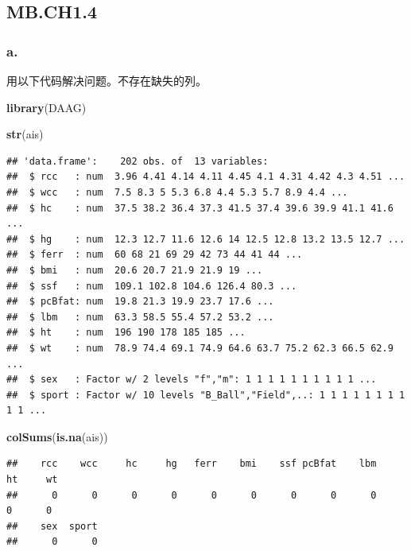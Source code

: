 \documentclass[
]{article}
\newenvironment{Shaded}{\begin{snugshade}}{\end{snugshade}}
\newcommand{\FunctionTok}[1]{\textcolor[rgb]{0.13,0.29,0.53}{\textbf{#1}}}
\newcommand{\NormalTok}[1]{#1}
\begin{document}
\subsection{MB.CH1.4}\label{mb.ch1.4}

\subsubsection{a.}\label{a.-3}

用以下代码解决问题。不存在缺失的列。

\begin{Shaded}
\begin{Highlighting}[]
\FunctionTok{library}\NormalTok{(DAAG)}

\FunctionTok{str}\NormalTok{(ais)}
\end{Highlighting}
\end{Shaded}

\begin{verbatim}
## 'data.frame':    202 obs. of  13 variables:
##  $ rcc   : num  3.96 4.41 4.14 4.11 4.45 4.1 4.31 4.42 4.3 4.51 ...
##  $ wcc   : num  7.5 8.3 5 5.3 6.8 4.4 5.3 5.7 8.9 4.4 ...
##  $ hc    : num  37.5 38.2 36.4 37.3 41.5 37.4 39.6 39.9 41.1 41.6 ...
##  $ hg    : num  12.3 12.7 11.6 12.6 14 12.5 12.8 13.2 13.5 12.7 ...
##  $ ferr  : num  60 68 21 69 29 42 73 44 41 44 ...
##  $ bmi   : num  20.6 20.7 21.9 21.9 19 ...
##  $ ssf   : num  109.1 102.8 104.6 126.4 80.3 ...
##  $ pcBfat: num  19.8 21.3 19.9 23.7 17.6 ...
##  $ lbm   : num  63.3 58.5 55.4 57.2 53.2 ...
##  $ ht    : num  196 190 178 185 185 ...
##  $ wt    : num  78.9 74.4 69.1 74.9 64.6 63.7 75.2 62.3 66.5 62.9 ...
##  $ sex   : Factor w/ 2 levels "f","m": 1 1 1 1 1 1 1 1 1 1 ...
##  $ sport : Factor w/ 10 levels "B_Ball","Field",..: 1 1 1 1 1 1 1 1 1 1 ...
\end{verbatim}

\begin{Shaded}
\begin{Highlighting}[]
\FunctionTok{colSums}\NormalTok{(}\FunctionTok{is.na}\NormalTok{(ais))}
\end{Highlighting}
\end{Shaded}

\begin{verbatim}
##    rcc    wcc     hc     hg   ferr    bmi    ssf pcBfat    lbm     ht     wt 
##      0      0      0      0      0      0      0      0      0      0      0 
##    sex  sport 
##      0      0
\end{verbatim}
\end{document}

